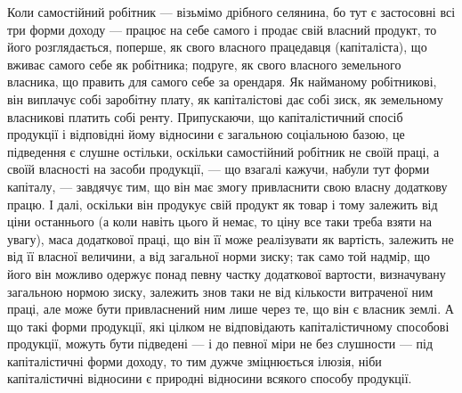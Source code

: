 Коли самостійний робітник — візьмімо дрібного селянина, бо тут є застосовні
всі три форми доходу — працює на себе самого і продає свій власний продукт, то
його розглядається, поперше, як свого власного працедавця (капіталіста), що вживає
самого себе як робітника; подруге, як свого власного земельного власника, що править
для самого себе за орендаря. Як найманому робітникові, він виплачує собі заробітну
плату, як капіталістові дає собі зиск, як земельному власникові платить
собі ренту. Припускаючи, що капіталістичний спосіб продукції і відповідні
йому відносини є загальною соціальною базою, це підведення є слушне
остільки, оскільки самостійний робітник не своїй праці, а своїй власності на
засоби продукції, — що взагалі кажучи, набули тут форми капіталу, — завдячує
тим, що він має змогу привласнити свою власну додаткову працю. І далі,
оскільки він продукує свій продукт як товар і тому залежить від ціни останнього
(а коли навіть цього й немає, то ціну все таки треба взяти на увагу),
маса додаткової праці, що він її може реалізувати як вартість, залежить не від
її власної величини, а від загальної норми зиску; так само той надмір, що його він
можливо одержує понад певну частку додаткової вартости, визначувану загальною
нормою зиску, залежить знов таки не від кількости витраченої ним праці, але
може бути привласнений ним лише через те, що він є власник землі. А що
такі форми продукції, які цілком не відповідають капіталістичному способові
продукції, можуть бути підведені — і до певної міри не без слушности — під капіталістичні форми
доходу, то тим дужче зміцнюється ілюзія, ніби капіталістичні
відносини є природні відносини всякого способу продукції.
\parbreak{}  %

